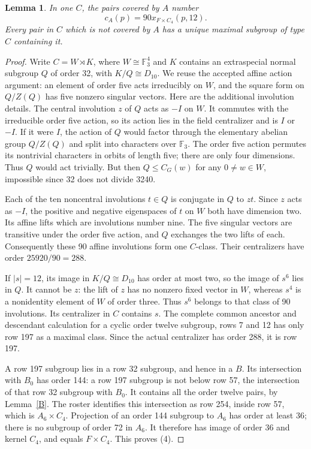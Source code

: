 \documentclass[11pt,a4paper]{article}
\newtheorem{lemma}{Lemma}\newtheorem{theorem}{Theorem}
\begin{document}
\begin{lemma}\label{affine}
In one $C$, the pairs covered by $A$ number
\[
                  c_A(p)=90x_{F\times C_4}(p,12).              \tag{4}
\]
Every pair in $C$ which is not covered by $A$ has a unique maximal
subgroup of type $C$ containing it.
\end{lemma}
\begin{proof}
Write $C=W\rtimes K$, where $W\cong\mathbb F_3^4$ and $K$ contains
an extraspecial normal subgroup $Q$ of order 32, with $K/Q\cong D_{10}$.
We reuse the accepted affine action argument: an element of order five
acts irreducibly on $W$, and the square form on $Q/Z(Q)$ has five
nonzero singular vectors. Here are the additional involution details.
The central involution $z$ of $Q$ acts as $-I$ on $W$. It commutes with
the irreducible order five action, so its action lies in the field
centralizer and is $I$ or $-I$. If it were $I$, the action of $Q$ would
factor through the elementary abelian group $Q/Z(Q)$ and split into
characters over $\mathbb F_3$. The order five action permutes its
nontrivial characters in orbits of length five; there are only four
dimensions. Thus $Q$ would act trivially. But then $Q\leq C_G(w)$ for
any $0\ne w\in W$, impossible since 32 does not divide 3240.

Each of the ten noncentral involutions $t\in Q$ is conjugate in $Q$
to $zt$. Since $z$ acts as $-I$, the positive and negative eigenspaces
of $t$ on $W$ both have dimension two. Its affine lifts which are
involutions number nine. The five singular vectors are transitive
under the order five action, and $Q$ exchanges the two lifts of each.
Consequently these 90 affine involutions form one $C$-class. Their
centralizers have order $25920/90=288$.

If $|s|=12$, its image in $K/Q\cong D_{10}$ has order at most two,
so the image of $s^6$ lies in $Q$. It cannot be $z$: the lift of $z$
has no nonzero fixed vector in $W$, whereas $s^4$ is a nonidentity
element of $W$ of order three. Thus $s^6$ belongs to that class of 90
involutions. Its centralizer in $C$ contains $s$. The complete common
ancestor and descendant calculation for a cyclic order twelve subgroup,
rows 7 and 12 has only row 197 as a maximal class. Since the actual
centralizer has order 288, it is row 197.

A row 197 subgroup lies in a row 32 subgroup, and hence in a $B$.
Its intersection with $B_0$ has order 144: a row 197 subgroup is
not below row 57, the intersection of that row 32 subgroup with $B_0$.
It contains all the order twelve pairs, by Lemma~\ref{B}. The roster identifies this intersection
as row 254, inside row 57, which is $A_6\times C_4$. Projection of an
order 144 subgroup to $A_6$ has order at least 36; there is no subgroup
of order 72 in $A_6$. It therefore has image of order 36 and kernel
$C_4$, and equals $F\times C_4$. This proves (4).


\end{proof}
\end{document}
